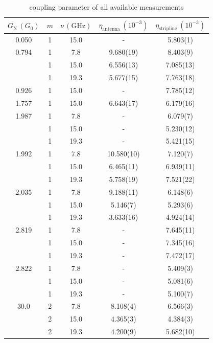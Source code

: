         \begin{table}[t]
            \centering
            \caption{coupling parameter of all available measurements}
            \label{table:ac:coupling-parameter}
            \begin{tabular}{c|c|c|c|c}
                $G_\mathrm{N}\,(G_0)$ & $m$ & $\nu\,(\mathrm{GHz})$ & $\eta_\mathrm{antenna}\ (10^{-3})$ & $\eta_\mathrm{stripline}\ (10^{-3})$ \\\hline
                0.050 & 1 & 15.0 &  -         &  5.803(1)  \\
                0.794 & 1 &  7.8 &  9.680(19) &  8.403(9)  \\
                      & 1 & 15.0 &  6.556(13) &  7.085(13) \\
                      & 1 & 19.3 &  5.677(15) &  7.763(18) \\
                0.926 & 1 & 15.0 &  -         &  7.785(12) \\
                1.757 & 1 & 15.0 &  6.643(17) &  6.179(16) \\
                1.987 & 1 &  7.8 &  -         &  6.079(7)  \\
                      & 1 & 15.0 &  -         &  5.230(12) \\
                      & 1 & 19.3 &  -         &  5.421(15) \\
                1.992 & 1 &  7.8 & 10.580(10) &  7.120(7)  \\
                      & 1 & 15.0 &  6.465(11) &  6.939(11) \\
                      & 1 & 19.3 &  5.758(19) &  7.521(22) \\
                2.035 & 1 &  7.8 &  9.188(11) &  6.148(6)  \\
                      & 1 & 15.0 &  5.146(7)  &  5.293(6)  \\
                      & 1 & 19.3 &  3.633(16) &  4.924(14) \\
                2.819 & 1 &  7.8 &  -         &  7.645(11) \\
                      & 1 & 15.0 &  -         &  7.345(16) \\
                      & 1 & 19.3 &  -         &  7.472(17) \\
                2.822 & 1 &  7.8 &  -         &  5.409(3)  \\
                      & 1 & 15.0 &  -         &  5.081(6)  \\
                      & 1 & 19.3 &  -         &  5.100(7)  \\
                30.0  & 2 &  7.8 &  8.108(4)  &  6.566(3)  \\
                      & 2 & 15.0 &  4.365(3)  &  4.384(3)  \\
                      & 2 & 19.3 &  4.200(9)  &  5.682(10) 
            \end{tabular}
        \end{table}